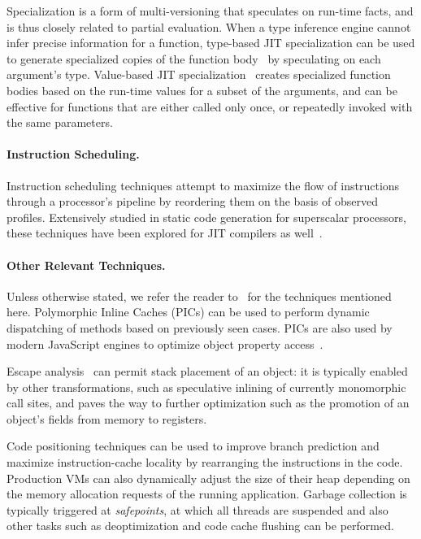 Specialization is a form of multi-versioning that speculates on run-time facts, and is thus closely related to partial evaluation. When a type inference engine cannot infer precise information for a function, type-based JIT specialization can be used to generate specialized copies of the function body~\cite{Cooper92} by speculating on each argument's type. Value-based JIT specialization~\cite{Santos13} creates specialized function bodies based on the run-time values for a subset of the arguments, and can be effective for functions that are either called only once, or repeatedly invoked with the same parameters.

\paragraph*{Instruction Scheduling.} Instruction scheduling techniques attempt to maximize the flow of instructions through a processor's pipeline by reordering them on the basis of observed profiles. Extensively studied in static code generation for superscalar processors, these techniques have been explored for JIT compilers as well~\cite{Arnold05, Touati14}.

\paragraph*{Other Relevant Techniques.} Unless otherwise stated, we refer the reader to~\cite{Arnold05} for the techniques mentioned here. Polymorphic Inline Caches (PICs) can be used to perform dynamic dispatching of methods based on previously seen cases. PICs are also used by modern JavaScript engines to optimize object property access~\cite{ChevalierBoisvert16}.

Escape analysis~\cite{Choi99} can permit stack placement of an object: it is typically enabled by other transformations, such as speculative inlining of currently monomorphic call sites, and paves the way to further optimization such as the promotion of an object's fields from memory to registers.

Code positioning techniques can be used to improve branch prediction and maximize instruction-cache locality by rearranging the instructions in the code. Production VMs can also dynamically adjust the size of their heap depending on the memory allocation requests of the running application. Garbage collection is typically triggered at {\em safepoints}, at which all threads are suspended and also other tasks such as deoptimization and code cache flushing can be performed.

